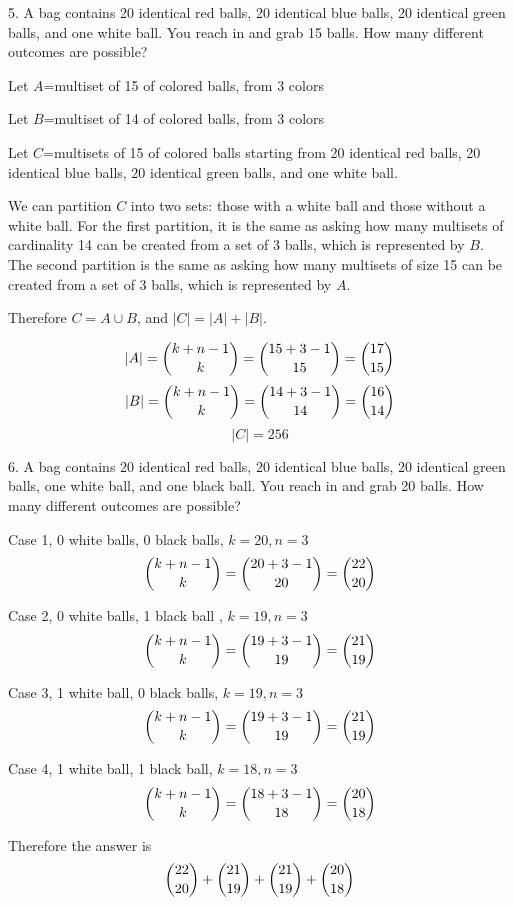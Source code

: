 \documentclass{hippoidC}
\begin{document}
\begin{prooflist}{5. A bag contains 20 identical red balls, 20 identical blue balls, 20 identical green balls, and one white ball. You reach in and grab 15 balls. How many different outcomes are possible?}
	\item Let $A$=multiset of 15 of colored balls, from 3 colors
	\item Let $B$=multiset of 14 of colored balls, from 3 colors
	\item Let $C$=multisets of 15 of colored balls starting from 20
	identical red balls, 20 identical blue balls, 20 identical green balls, and
	one white ball.
	\item We can partition $C$ into two sets: those with a white ball and those
	without a white ball. For the first partition, it is the same as asking how
	many multisets of cardinality 14 can be created from a set of 3 balls, which
	is represented by $B$. The second partition is the same as asking how many
	multisets of size 15 can be created from a set of 3 balls, which is
	represented by $A$.
	\item Therefore $C=A \cup B$, and $|C| = |A| + |B|$.
	\item
	$$ |A| = \dbinom{k+n-1}{k} = \dbinom{15+3-1}{15}=\dbinom{17}{15}$$
	$$ |B| = \dbinom{k+n-1}{k} = \dbinom{14+3-1}{14}=\dbinom{16}{14}$$
	$$ |C| = 256 $$
	\item
\end{prooflist}

\begin{prooflist}{6. A bag contains 20 identical red balls, 20 identical blue
		balls, 20 identical green balls, one white ball, and one black ball. You
		reach in and grab 20 balls. How many different outcomes are possible?}
	\item Case 1, 0 white balls, 0 black balls, $k=20, n=3$
	$$ \dbinom{k+n-1}{k} = \dbinom{20+3-1}{20}=\dbinom{22}{20}$$
	\item Case 2, 0 white balls, 1 black ball , $k=19, n=3$
	$$ \dbinom{k+n-1}{k} = \dbinom{19+3-1}{19}=\dbinom{21}{19}$$
	\item Case 3, 1 white ball, 0 black balls, $k=19, n=3$
	$$ \dbinom{k+n-1}{k} = \dbinom{19+3-1}{19}=\dbinom{21}{19}$$
	\item Case 4, 1 white ball, 1 black ball, $k=18, n=3$
	$$ \dbinom{k+n-1}{k} = \dbinom{18+3-1}{18}=\dbinom{20}{18}$$
	\item Therefore the answer is
	$$ \dbinom{22}{20} +\dbinom{21}{19} +\dbinom{21}{19} +\dbinom{20}{18}$$
\end{prooflist}
\end{document}
